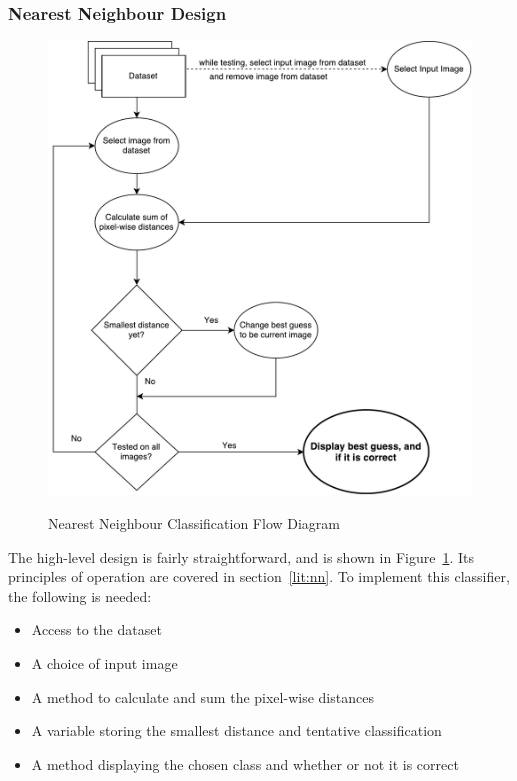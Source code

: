 \subsubsection{Nearest Neighbour Design}
\begin{figure}
\centering
\includegraphics[width=\textwidth]{figures/nearest-neighbour}
\label{fig:nn}
\caption{Nearest Neighbour Classification Flow Diagram}
\centering
\end{figure}


The high-level design is fairly straightforward, and is shown in Figure~\ref{fig:nn}. Its principles of operation are covered in section~\ref{lit:nn}. To implement this classifier, the following is needed:

\begin{itemize}
	\item Access to the dataset
	\item A choice of input image
	\item A method to calculate and sum the pixel-wise distances
	\item A variable storing the smallest distance and tentative classification
	\item A method displaying the chosen class and whether or not it is correct
\end{itemize}



